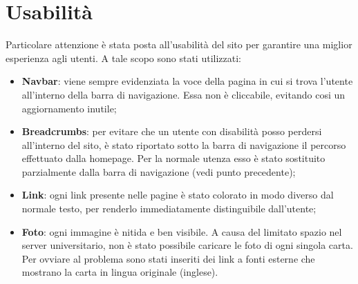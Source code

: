 \section{Usabilità}
Particolare attenzione è stata posta all'usabilità del sito per garantire una miglior esperienza agli utenti. A tale scopo sono stati utilizzati:
\begin{itemize}
	\item \textbf{Navbar}: viene sempre evidenziata la voce della pagina in cui si trova l'utente all'interno della barra di navigazione. Essa non è cliccabile, evitando cosi un aggiornamento inutile;
	\item \textbf{Breadcrumbs}: per evitare che un utente con disabilità posso perdersi all'interno del sito, è stato riportato sotto la barra di navigazione il percorso effettuato dalla homepage. Per la normale utenza esso è stato sostituito parzialmente dalla barra di navigazione (vedi punto precedente);
	\item \textbf{Link}: ogni link presente nelle pagine è stato colorato in modo diverso dal normale testo, per renderlo immediatamente distinguibile dall'utente;
	\item \textbf{Foto}: ogni immagine è nitida e ben visibile. A causa del limitato spazio nel server universitario, non è stato possibile caricare le foto di ogni singola carta. Per ovviare al problema sono stati inseriti dei link a fonti esterne che mostrano la carta in lingua originale (inglese).
\end{itemize}


\newpage